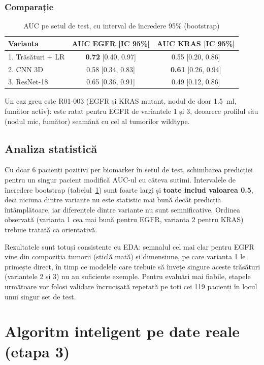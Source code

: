 \documentclass[runningheads,a4paper,11pt]{report}
\begin{document}
\subsection{Comparație}
\begin{table}[htbp]
    \centering
    \begin{tabular}{lcc}
        \toprule
        \textbf{Varianta} & \textbf{AUC EGFR [IC 95\%]} & \textbf{AUC KRAS [IC 95\%]} \\
        \midrule
        1. Trăsături + LR & \textbf{0.72} [0.40, 0.97] & 0.55 [0.20, 0.86] \\
        2. CNN 3D & 0.58 [0.34, 0.83] & \textbf{0.61} [0.26, 0.94] \\
        3. ResNet-18 & 0.65 [0.36, 0.91] & 0.49 [0.12, 0.86] \\
        \bottomrule
    \end{tabular}
    \caption{AUC pe setul de test, cu interval de încredere 95\% (bootstrap)}
    \label{tab:comparatie}
\end{table}

Un caz greu este R01-003 (EGFR și KRAS mutant, nodul de doar 1.5~ml, fumător activ): este ratat pentru EGFR de variantele 1 și 3, deoarece profilul său (nodul mic, fumător) seamănă cu cel al tumorilor wildtype.

\section{Analiza statistică}
Cu doar 6 pacienți pozitivi per biomarker în setul de test, schimbarea predicției pentru un singur pacient modifică AUC-ul cu câteva sutimi. Intervalele de încredere bootstrap (tabelul~\ref{tab:comparatie}) sunt foarte largi și \textbf{toate includ valoarea 0.5}, deci niciuna dintre variante nu este statistic mai bună decât predicția întâmplătoare, iar diferențele dintre variante nu sunt semnificative. Ordinea observată (varianta 1 cea mai bună pentru EGFR, varianta 2 pentru KRAS) trebuie tratată ca orientativă.

Rezultatele sunt totuși consistente cu EDA: semnalul cel mai clar pentru EGFR vine din compoziția tumorii (sticlă mată) și dimensiune, pe care varianta 1 le primește direct, în timp ce modelele care trebuie să învețe singure aceste trăsături (variantele 2 și 3) nu au suficiente exemple. Pentru evaluări mai fiabile, etapele următoare vor folosi validare încrucișată repetată pe toți cei 119 pacienți în locul unui singur set de test.


\chapter{Algoritm inteligent pe date reale (etapa 3)}
\label{chapter:etapa3}
\end{document}

